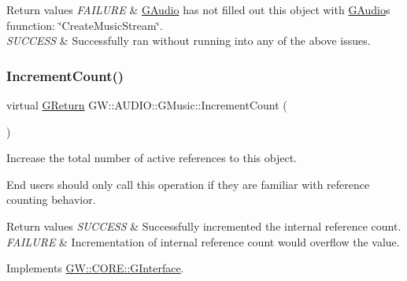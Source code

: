 \begin{DoxyRetVals}{Return values}
{\em F\+A\+I\+L\+U\+RE} & \mbox{\hyperlink{classGW_1_1AUDIO_1_1GAudio}{G\+Audio}} has not filled out this object with \mbox{\hyperlink{classGW_1_1AUDIO_1_1GAudio}{G\+Audio}}\textquotesingle{}s fuunction\+: \char`\"{}\+Create\+Music\+Stream\char`\"{}. \\
\hline
{\em S\+U\+C\+C\+E\+SS} & Successfully ran without running into any of the above issues. \\
\hline
\end{DoxyRetVals}
\mbox{\label{classGW_1_1AUDIO_1_1GMusic_a22d7a170b4d307e5398ebb92f950431f}} 
\subsubsection{\texorpdfstring{Increment\+Count()}{IncrementCount()}}
{\footnotesize\ttfamily virtual \mbox{\hyperlink{namespaceGW_a67a839e3df7ea8a5c5686613a7a3de21}{G\+Return}} G\+W\+::\+A\+U\+D\+I\+O\+::\+G\+Music\+::\+Increment\+Count (\begin{DoxyParamCaption}{ }\end{DoxyParamCaption})\hspace{0.3cm}{\ttfamily [pure virtual]}}



Increase the total number of active references to this object. 

End users should only call this operation if they are familiar with reference counting behavior.


\begin{DoxyRetVals}{Return values}
{\em S\+U\+C\+C\+E\+SS} & Successfully incremented the internal reference count. \\
\hline
{\em F\+A\+I\+L\+U\+RE} & Incrementation of internal reference count would overflow the value. \\
\hline
\end{DoxyRetVals}


Implements \mbox{\hyperlink{classGW_1_1CORE_1_1GInterface_a2d710f20bb78e544e8309b5b75c21260}{G\+W\+::\+C\+O\+R\+E\+::\+G\+Interface}}.

\mbox{\label{classGW_1_1AUDIO_1_1GMusic_a0a0f4d5e0d11f7aec7ed9a1a6371df1a}} 
